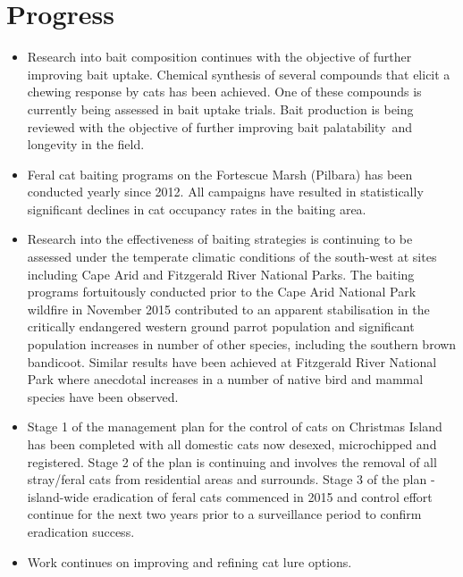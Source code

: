 \documentclass[version=last,
    paper=a4, %
    10pt, %
    usenames,
    dvipsnames,
    oneside, %
    headings=openany, %
    DIV=15 %
]{scrbook}
\begin{document}
\section*{Progress}
\begin{itemize}
\itemsep1pt\parskip0pt
\item
  Research into bait composition continues with the objective of further
  improving bait uptake. Chemical synthesis of several compounds that
  elicit a chewing response by cats has been achieved. One of these
  compounds is currently being assessed in bait uptake trials. Bait
  production is being reviewed with the objective of further improving
  bait palatability~and longevity in the field.~
\item
  Feral cat baiting programs on the Fortescue Marsh (Pilbara) has been
  conducted yearly since 2012. All campaigns have resulted in
  statistically significant declines in cat occupancy rates in the
  baiting area.
\item
  Research into the effectiveness of baiting strategies is continuing to
  be assessed under the temperate climatic conditions of the south-west
  at sites including Cape Arid and Fitzgerald River National Parks. The
  baiting programs fortuitously conducted prior to the Cape Arid
  National Park wildfire in November 2015 contributed to an apparent
  stabilisation in the critically endangered western ground parrot
  population and significant population increases in number of other
  species, including the southern brown bandicoot. Similar results have
  been achieved at Fitzgerald River National Park where anecdotal
  increases in a number of native bird and mammal species have been
  observed.
\item
  Stage 1 of the management plan for the control of cats on Christmas
  Island has been completed with all domestic cats now desexed,
  microchipped and registered. Stage 2 of the plan is continuing and
  involves the removal of all stray/feral cats from residential areas
  and surrounds. Stage 3 of the plan - island-wide eradication of feral
  cats commenced in 2015 and control effort continue for the next two
  years prior to a surveillance period to confirm eradication success.
\item
  Work continues on improving and refining cat lure options.
\end{itemize}
\end{document}
